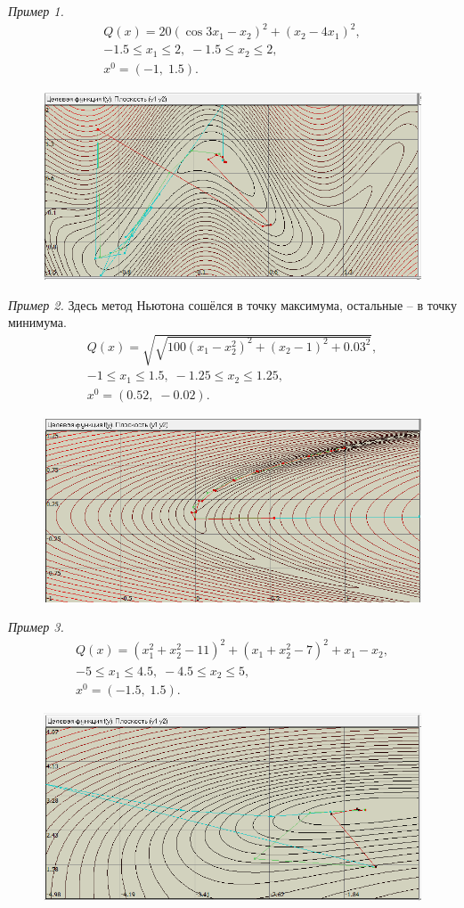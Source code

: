 \documentclass[12pt,a4paper]{article}
\begin{document}
\textit{Пример 1.}
\begin{gather*}
    Q(x) = 20(\cos{3x_1}-x_2)^2 + (x_2-4x_1)^2,\\
    -1.5 \le x_1 \le 2, \; -1.5 \le x_2 \le 2,\\
    x^0 = (-1, \; 1.5).
\end{gather*}

\begin{figure}[H]
    \centering
    \includegraphics{img/newton1.png}
\end{figure}

\textit{Пример 2.} Здесь метод Ньютона сошёлся в точку максимума, остальные -- в точку минимума.
\begin{gather*}
    Q(x) = \sqrt{\sqrt{100(x_1-x_2^2)^2 + (x_2-1)^2 + 0.03^2}},\\
    -1 \le x_1 \le 1.5, \; -1.25 \le x_2 \le 1.25,\\
    x^0 = (0.52, \; -0.02).
\end{gather*}        
\begin{figure}[H]
    \centering
    \includegraphics{img/newton2.png}
\end{figure}

\textit{Пример 3.}
\begin{gather*}
    Q(x) = (x_1^2+x_2^2-11)^2 + (x_1+x_2^2-7)^2+x_1-x_2,\\
    -5 \le x_1 \le 4.5, \; -4.5 \le x_2 \le 5,\\
    x^0=(-1.5, \; 1.5).
\end{gather*}

\begin{figure}[H]
    \centering
    \includegraphics{img/newton3.png}
\end{figure}
\end{document}
